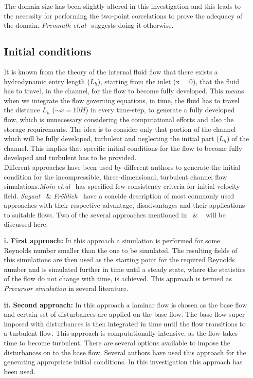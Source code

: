 %
The domain size has been slightly altered in this investigation and this leads to the necessity for performing the two-point correlations to prove the adequacy of the domain. \emph{Premnath et.al}~\cite{Premnath:09} suggests doing it otherwise.
%
%
\subsection{Initial conditions}
It is known from the theory of the internal fluid flow that there exists a hydrodynamic entry length ($L_h$), starting from the inlet (x = 0), that the fluid has to travel, in the channel, for the flow to become fully developed. This means when we integrate the flow governing equations, in time, the fluid has to travel the distance $L_h$ ($\sim{x} =10H$) in every time-step, to generate a fully developed flow, which is unnecessary considering the computational efforts and also the storage requirements. The idea is to consider only that portion of the channel which will be fully developed, turbulent and neglecting the initial part ($L_h$) of the channel. This implies that specific initial conditions for the flow to become fully developed and turbulent has to be provided.\\
%
Different approaches have been used by different authors to generate the initial condition for the incompressible, three-dimensional, turbulent channel flow simulations.\emph{Moin et.al}~\cite{Moin:78} has specified few consistency criteria for initial velocity field. \emph{Sagaut}~\cite{sagaut:02} \& \emph{Fröhlich}~\cite{froehlich:book} have a concide description of most commonly used approaches with their respective advantage, disadvantages and their applications to suitable flows. Two of the several approaches mentioned in~\cite{sagaut:02} \& ~\cite{froehlich:book} will be discussed here.

\textbf{i. First approach:} In this approach a simulation is performed for some Reynolds number smaller than the one to be simulated. The resulting fields of this simulations are then used as the starting point for the required Reynolds number and is  simulated further in time until a steady state, where the statistics of the flow do not change with time, is achieved. This approach is termed as \emph{Precursor simulation} in several literature.

\textbf{ii. Second approach: } In this approach a laminar flow is chosen as the base flow and certain set of disturbances are applied on the base flow. The base flow super-imposed with disturbances is then integrated in time until the flow transitions to a turbulent flow. This approach is computationally intensive, as the flow takes time to become turbulent. There are several options available to impose the disturbances on to the base flow. Several authors have used this approach for the generating appropriate initial conditions. In this investigation this approach has been used.\\

